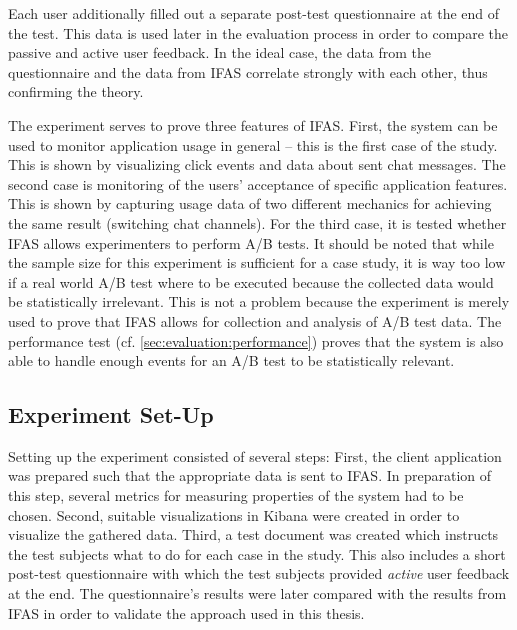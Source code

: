 Each user additionally filled out a separate post-test questionnaire at the end of the test.
This data is used later in the evaluation process in order to compare the passive and active user feedback.
In the ideal case, the data from the questionnaire and the data from \ac{IFAS} correlate strongly with each other, thus confirming the theory.

The experiment serves to prove three features of \ac{IFAS}.
First, the system can be used to monitor application usage in general -- this is the first case of the study.
This is shown by visualizing click events and data about sent chat messages.
The second case is monitoring of the users' acceptance of specific application features.
This is shown by capturing usage data of two different mechanics for achieving the same result (switching chat channels).
For the third case, it is tested whether \ac{IFAS} allows experimenters to perform A/B tests.
It should be noted that while the sample size for this experiment is sufficient for a case study, it is way too low if a real world A/B test where to be executed because the collected data would be statistically irrelevant.
This is not a problem because the experiment is merely used to prove that \ac{IFAS} allows for collection and analysis of A/B test data.
The performance test (cf. \cref{sec:evaluation:performance}) proves that the system is also able to handle enough events for an A/B test to be statistically relevant.

%

\subsection{Experiment Set-Up}

Setting up the experiment consisted of several steps:
First, the client application was prepared such that the appropriate data is sent to \ac{IFAS}.
In preparation of this step, several metrics for measuring properties of the system had to be chosen.
Second, suitable visualizations in Kibana were created in order to visualize the gathered data.
Third, a test document was created which instructs the test subjects what to do for each case in the study.
This also includes a short post-test questionnaire with which the test subjects provided \emph{active} user feedback at the end.
The questionnaire's results were later compared with the results from \ac{IFAS} in order to validate the approach used in this thesis.

